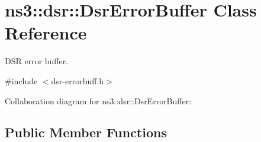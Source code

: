 \hypertarget{classns3_1_1dsr_1_1DsrErrorBuffer}{}\section{ns3\+:\+:dsr\+:\+:Dsr\+Error\+Buffer Class Reference}
\label{classns3_1_1dsr_1_1DsrErrorBuffer}


D\+SR error buffer.  




{\ttfamily \#include $<$dsr-\/errorbuff.\+h$>$}



Collaboration diagram for ns3\+:\+:dsr\+:\+:Dsr\+Error\+Buffer\+:
\subsection*{Public Member Functions}
